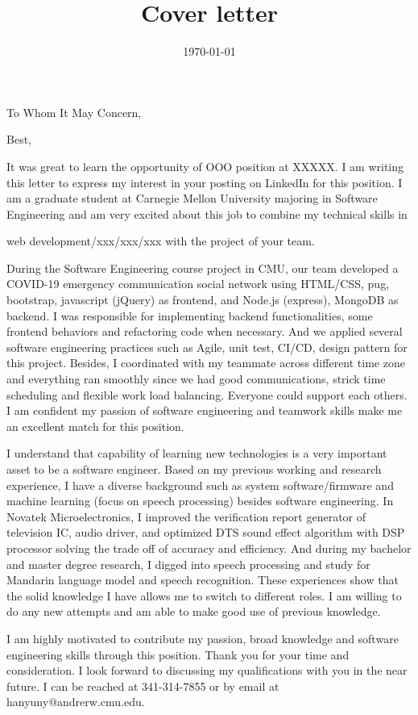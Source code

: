 \documentclass[11pt,a4paper,roman]{moderncv}        %
\title{Cover letter}                               %
\begin{document}
\recipient{\ }{}
\date{\today}
\opening{To Whom It May Concern,}
\closing{Best,}
\makelettertitle

It was great to learn the opportunity of OOO position at XXXXX. 
I am writing this letter to express my interest in your posting on LinkedIn for this position.
I am a graduate student at Carnegie Mellon University majoring in Software Engineering and
am very excited about this job to combine my technical skills in 

web development/xxx/xxx/xxx with the project of your team.

During the Software Engineering course project in CMU, 
our team developed a COVID-19 emergency communication social network using HTML/CSS, pug, bootstrap, javascript (jQuery) as frontend,
and Node.js (express), MongoDB as backend.
I was responsible for implementing backend functionalities, some frontend behaviors and refactoring code when necessary.
And we applied several software engineering practices such as Agile, unit test, CI/CD, design pattern for this project.
Besides, I coordinated with my teammate across different time zone and everything ran smoothly 
since we had good communications, strick time scheduling and flexible work load balancing. Everyone could support each others.
I am confident my passion of software engineering and teamwork skills make me an excellent match for this position.

I understand that capability of learning new technologies is a very important asset to be a software engineer.
Based on my previous working and research experience, I have a diverse background such as system software/firmware and machine learning (focus on speech processing) besides software engineering.
In Novatek Microelectronics, I improved the verification report generator of television IC, audio driver, and optimized DTS sound effect algorithm with DSP processor solving the trade off of accuracy and efficiency.
And during my bachelor and master degree research, I digged into speech processing and study for Mandarin language model and speech recognition.
These experiences show that the solid knowledge I have allows me to switch to different roles. 
I am willing to do any new attempts and am able to make good use of previous knowledge.

I am highly motivated to contribute my passion, broad knowledge and software engineering skills through this position.
Thank you for your time and consideration. 
I look forward to discussing my qualifications with you in the near future. 
I can be reached at 341-314-7855 or by email at hanyuny@andrerw.cmu.edu.











\vspace{0.5cm}


\makeletterclosing
\end{document}
